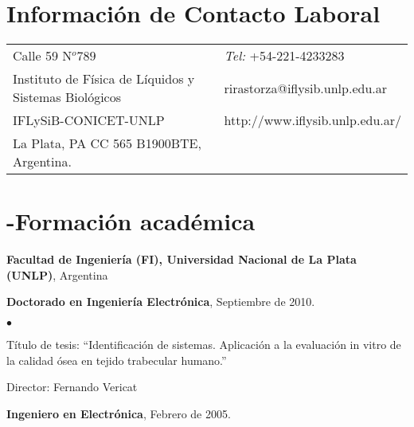 \documentclass[margin,line]{res}
\newenvironment{list1}{
  \begin{list}{\ding{113}}{%
      \setlength{\itemsep}{0in}
      \setlength{\parsep}{0in} \setlength{\parskip}{0in}
      \setlength{\topsep}{0in} \setlength{\partopsep}{0in} 
      \setlength{\leftmargin}{0.17in}}}{\end{list}}
\newenvironment{list2}{
  \begin{list}{$\bullet$}{%
      \setlength{\itemsep}{0in}
      \setlength{\parsep}{0in} \setlength{\parskip}{0in}
      \setlength{\topsep}{0in} \setlength{\partopsep}{0in} 
      \setlength{\leftmargin}{0.2in}}}{\end{list}}
\begin{document}

\begin{resume}
\section{\sc Información de Contacto Laboral}
\vspace{.05in}
\begin{tabular}{@{}p{3.5in}p{3in}}
Calle 59 N$^o789$             & {\it Tel:} +54-221-4233283 \\            
Instituto de Física de Líquidos y Sistemas Biológicos & rirastorza@iflysib.unlp.edu.ar\\         
IFLySiB-CONICET-UNLP & http://www.iflysib.unlp.edu.ar/ \\       
La Plata, PA CC 565 B1900BTE, Argentina. & \\     
\end{tabular}

% 

\section{-Formación académica}
{\bf Facultad de Ingeniería (FI), Universidad Nacional de La Plata (UNLP)}, Argentina\\
\vspace*{.1in}
\begin{list1}
\item[] \textbf{Doctorado en Ingeniería Electrónica}, Septiembre de 2010.
\begin{list2}
\vspace*{.1in}
\item Título de tesis:  ``Identificación de sistemas. Aplicación a la evaluación in vitro de la calidad ósea en tejido trabecular humano.'' 
\item Director:  Fernando Vericat
\end{list2}
\vspace*{.3in}
\item[] \textbf{Ingeniero en Electrónica}, Febrero de 2005.
\end{list1}


\end{resume}
\end{document}
